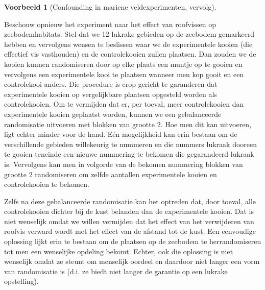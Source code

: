 \documentclass[
  12pt,dutch,coursenotes]{book}
\theoremstyle{definition}
\theoremstyle{definition}
\newtheorem{example}{Voorbeeld}[chapter]
\theoremstyle{definition}
\theoremstyle{remark}
\begin{document}
\begin{example}[Confounding in mariene veldexperimenten, vervolg]
\protect\hypertarget{exm:unnamed-chunk-71}{}{\label{exm:unnamed-chunk-71} \iffalse (Confounding in mariene veldexperimenten, vervolg) \fi{} }
\end{example}
Beschouw opnieuw het experiment naar het effect van roofvissen op zeebodemhabitats. Stel dat we 12 lukrake gebieden op de zeebodem gemarkeerd hebben en vervolgens wensen te beslissen waar we de experimentele kooien (die effectief vis vasthouden) en de controlekooien zullen plaatsen. Dan zouden we de kooien kunnen randomiseren door op elke plaats een muntje op te gooien en vervolgens een experimentele kooi te plaatsen wanneer men kop gooit en een controlekooi anders. Die procedure is erop gericht te garanderen dat experimentele kooien op vergelijkbare plaatsen opgesteld worden als controlekooien. Om te vermijden dat er, per toeval, meer controlekooien dan experimentele kooien geplaatst worden, kunnen we een gebalanceerde randomisatie uitvoeren met blokken van grootte 2. Hoe men dit kan uitvoeren, ligt echter minder voor de hand. Eén mogelijkheid kan erin bestaan om de verschillende gebieden willekeurig te nummeren en die nummers lukraak dooreen te gooien teneinde een nieuwe nummering te bekomen die gegarandeerd lukraak is. Vervolgens kan men in volgorde van de bekomen nummering blokken van grootte 2 randomiseren om zelfde aantallen experimentele kooien en controlekooien te bekomen.

Zelfs na deze gebalanceerde randomisatie kan het optreden dat, door toeval, alle controlekooien dichter bij de kust belanden dan de experimentele kooien. Dat is niet wenselijk omdat we willen vermijden dat het effect van het verwijderen van roofvis verward wordt met het effect van de afstand tot de kust. Een eenvoudige oplossing lijkt erin te bestaan om de plaatsen op de zeebodem te herrandomiseren tot men een wenselijke opdeling bekomt. Echter, ook die oplossing is niet wenselijk omdat ze steunt om menselijk oordeel en daardoor niet langer een vorm van randomisatie is (d.i. ze biedt niet langer de garantie op een lukrake opstelling).
\end{document}
